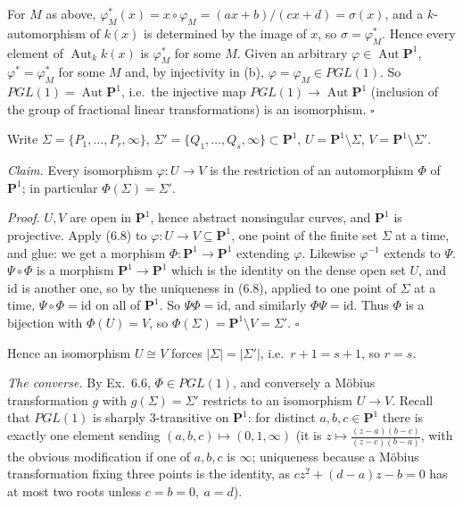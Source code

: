 \documentclass[11pt]{article}
\begin{document}
For $M$ as above, $\varphi_M^*(x)=x\circ\varphi_M=(ax+b)/(cx+d)=\sigma(x)$, and a $k$-automorphism of $k(x)$ is determined by the image of $x$, so $\sigma=\varphi_M^*$. Hence every element of $\operatorname{Aut}_kk(x)$ is $\varphi_M^*$ for some $M$. Given an arbitrary $\varphi\in\operatorname{Aut}\mathbf P^1$, $\varphi^*=\varphi_M^*$ for some $M$ and, by injectivity in (b), $\varphi=\varphi_M\in PGL(1)$. So $PGL(1)=\operatorname{Aut}\mathbf P^1$, i.e.\ the injective map $PGL(1)\to\operatorname{Aut}\mathbf P^1$ (inclusion of the group of fractional linear transformations) is an isomorphism. \hfill$\square$

\pf
Write $\Sigma=\{P_1,\dots,P_r,\infty\}$, $\Sigma'=\{Q_1,\dots,Q_s,\infty\}\subset\mathbf P^1$, $U=\mathbf P^1\setminus\Sigma$, $V=\mathbf P^1\setminus\Sigma'$.

\emph{Claim.} Every isomorphism $\varphi:U\to V$ is the restriction of an automorphism $\Phi$ of $\mathbf P^1$; in particular $\Phi(\Sigma)=\Sigma'$.

\emph{Proof.} $U,V$ are open in $\mathbf P^1$, hence abstract nonsingular curves, and $\mathbf P^1$ is projective. Apply (6.8) to $\varphi:U\to V\subseteq\mathbf P^1$, one point of the finite set $\Sigma$ at a time, and glue: we get a morphism $\Phi:\mathbf P^1\to\mathbf P^1$ extending $\varphi$. Likewise $\varphi^{-1}$ extends to $\Psi$. $\Psi\circ\Phi$ is a morphism $\mathbf P^1\to\mathbf P^1$ which is the identity on the dense open set $U$, and $\mathrm{id}$ is another one, so by the uniqueness in (6.8), applied to one point of $\Sigma$ at a time, $\Psi\circ\Phi=\mathrm{id}$ on all of $\mathbf P^1$. So $\Psi\Phi=\mathrm{id}$, and similarly $\Phi\Psi=\mathrm{id}$. Thus $\Phi$ is a bijection with $\Phi(U)=V$, so $\Phi(\Sigma)=\mathbf P^1\setminus V=\Sigma'$. \hfill$\square$

Hence an isomorphism $U\cong V$ forces $|\Sigma|=|\Sigma'|$, i.e.\ $r+1=s+1$, so $r=s$.

\emph{The converse.} By Ex.~6.6, $\Phi\in PGL(1)$, and conversely a Möbius transformation $g$ with $g(\Sigma)=\Sigma'$ restricts to an isomorphism $U\to V$. Recall that $PGL(1)$ is sharply $3$-transitive on $\mathbf P^1$: for distinct $a,b,c\in\mathbf P^1$ there is exactly one element sending $(a,b,c)\mapsto(0,1,\infty)$ (it is $z\mapsto\frac{(z-a)(b-c)}{(z-c)(b-a)}$, with the obvious modification if one of $a,b,c$ is $\infty$; uniqueness because a Möbius transformation fixing three points is the identity, as $cz^2+(d-a)z-b=0$ has at most two roots unless $c=b=0,\ a=d$).
\end{document}
